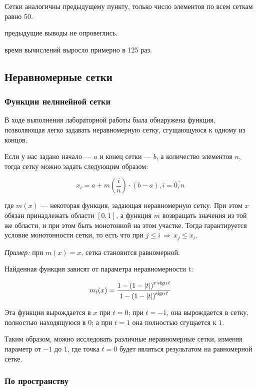 Сетки аналогичны предыдущему пункту, только число элементов по всем сеткам равно 50.


\conclusion предыдущие выводы не опровеглись.

\conclusion время вычислений выросло примерно в 125 раз.

\subsection{Неравномерные сетки}

\subsubsection{Функции нелинейной сетки}

В ходе выполнения лабораторной работы была обнаружена функция, позволяющая легко задавать неравномерную сетку, сгущающуюся к одному из концов.

Если у нас задано начало --- $a$ и конец сетки --- $b$, а количество элементов $n$, тогда сетку можно задать следующим образом:

$$ x_i = a + m\left(\frac{i}{n}\right) \cdot (b-a), i=\overline{0, n} $$

где $m(x)$ --- некоторая функция, задающая неравномерную сетку. При этом $x$ обязан принадлежать области $[0, 1]$, а функция $m$ возвращать значения из той же области, и при этом быть монотонной на этом участке. Тогда гарантируется условие монотонности сетки, то есть что при $j \leqslant i\, \Rightarrow\, x_j \leqslant x_i$. 

\textit{Пример:} при $m(x) = x$, сетка становится равномерной.

Найденная функция зависят от параметра неравномерности t:

$$ m_t(x) = \frac{1-\left(1-|t|\right)^{x\operatorname{sign} t}}{1-\left(1-|t|\right)^{\operatorname{sign} t}} $$

Эта функции вырождается в $x$ при $t=0$; при $t=-1$, она вырождается в сетку, полностью находящуюся в $0$; а при $t=1$ она полностью сгущается к $1$. 

Таким образом, можно исследовать различные неравномерные сетки, изменяя параметр от $-1$ до $1$, где точка $t=0$ будет являться результатом на равномерной сетке.

\subsubsection{По пространству}

